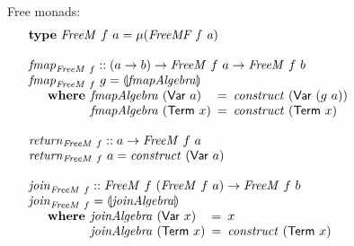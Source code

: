 \documentclass{jfp1}
\newcommand{\fold}[1]{\llparenthesis #1 \rrparenthesis}
\newcommand{\kw}[1]{\textbf{#1}}
\begin{document}
\begin{figure}
  Free monads:
  \begin{displaymath}
    \begin{array}{@{}l}
      \kw{type}~\mathit{FreeM}~f~a = \mu(\mathit{FreeMF~f~a}) \\
      \\
      \begin{array}{@{}l}
        \mathit{fmap}_{\mathit{FreeM}~f} :: (a \to b) \to \mathit{FreeM}~f~a \to \mathit{FreeM}~f~b \\
        \mathit{fmap}_{\mathit{FreeM}~f}~g = \fold{\mathit{fmapAlgebra}} \\
        \quad\begin{array}{r@{\hspace{0.4em}}l@{\hspace{0.5em}}c@{\hspace{0.5em}}l}
          \kw{where} & \mathit{fmapAlgebra}~(\mathsf{Var}~a) &=& \mathit{construct}~(\mathsf{Var}~(g~a)) \\
          & \mathit{fmapAlgebra}~(\mathsf{Term}~x) &=& \mathit{construct}~(\mathsf{Term}~x)
        \end{array}
      \end{array} \\
      \\
      \begin{array}{@{}l}
        \mathit{return}_{\mathit{FreeM}~f} :: a \to \mathit{FreeM}~f~a \\
        \mathit{return}_{\mathit{FreeM}~f}~a = \mathit{construct}~(\mathsf{Var}~a)
      \end{array} \\
      \\
      \begin{array}{@{}l}
        \mathit{join}_{\mathit{FreeM}~f} :: \mathit{FreeM}~f~(\mathit{FreeM}~f~a) \to \mathit{FreeM}~f~b \\
        \mathit{join}_{\mathit{FreeM}~f} = \fold{\mathit{joinAlgebra}} \\
        \quad\begin{array}{r@{\hspace{0.4em}}l@{\hspace{0.5em}}c@{\hspace{0.5em}}l}
          \kw{where} & \mathit{joinAlgebra}~(\mathsf{Var}~x) &=& x \\
          & \mathit{joinAlgebra}~(\mathsf{Term}~x) &=& \mathit{construct}~(\mathsf{Term}~x)
        \end{array}
      \end{array} \\

\end{array}
\end{displaymath}
\end{figure}
\end{document}
